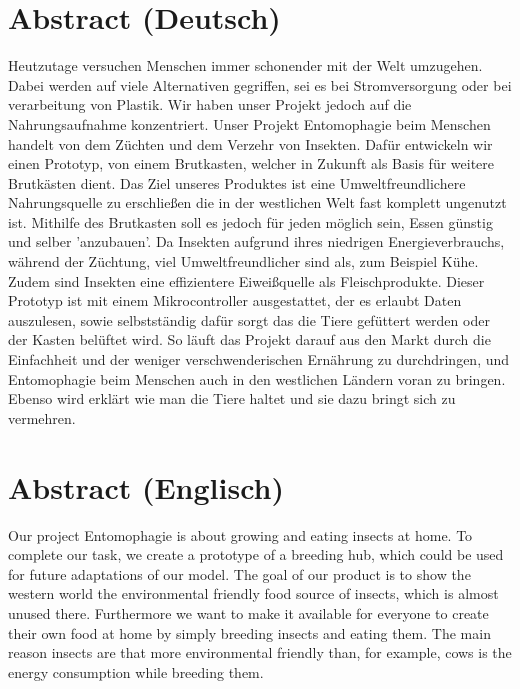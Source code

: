 \chapter*{Abstract (Deutsch)}
Heutzutage versuchen Menschen immer schonender mit der Welt umzugehen. Dabei werden auf viele Alternativen gegriffen, sei es bei Stromversorgung oder bei verarbeitung von Plastik. Wir haben unser Projekt jedoch auf die Nahrungsaufnahme konzentriert. Unser Projekt Entomophagie beim Menschen handelt von dem Züchten und dem Verzehr von Insekten. Dafür entwickeln wir einen Prototyp, von einem Brutkasten, welcher in Zukunft als
Basis für weitere Brutkästen dient. Das Ziel unseres Produktes ist eine Umweltfreundlichere
Nahrungsquelle zu erschließen die in der westlichen Welt fast komplett ungenutzt ist. Mithilfe des Brutkasten soll es jedoch für jeden möglich sein, Essen günstig und selber ’anzubauen’. Da Insekten aufgrund ihres niedrigen Energieverbrauchs, während der Züchtung, viel Umweltfreundlicher sind als, zum Beispiel Kühe. Zudem sind Insekten eine effizientere Eiweißquelle als Fleischprodukte. Dieser Prototyp ist mit einem Mikrocontroller ausgestattet, der es erlaubt Daten auszulesen, sowie selbstständig dafür sorgt das die Tiere gefüttert werden oder der Kasten belüftet wird. So läuft das Projekt darauf aus den Markt durch die Einfachheit und der weniger verschwenderischen Ernährung zu durchdringen, und Entomophagie beim Menschen auch in den westlichen Ländern voran zu bringen. Ebenso wird erklärt wie man die Tiere haltet und sie dazu bringt sich zu vermehren.


\chapter*{Abstract (Englisch)}
Our project Entomophagie is about growing and eating insects at home. To complete our task, we create a prototype of a breeding hub, which could be used for future adaptations of our model. The goal of our product is to show the western world the environmental friendly food source of insects, which is almost unused there. Furthermore we want to make it available for everyone to create their own food at home by simply breeding insects and eating them. The main reason insects are that more environmental friendly than, for example, cows is the energy consumption while breeding them.